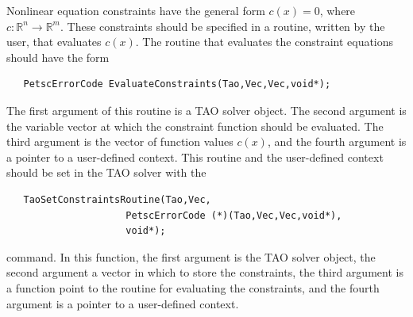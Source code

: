 \documentclass[]{book}
\newcommand{\R}{\mathbb R}
\renewcommand{\Re}{\R}
\begin{document}
Nonlinear equation constraints have the general form $c(x) = 0$, where 
$c: \Re^n \to \Re^m$.  These constraints should be specified in a routine, 
written by the user, that evaluates $c(x)$.  The routine that evaluates
the 
constraint equations should have the form
\begin{verbatim}
   PetscErrorCode EvaluateConstraints(Tao,Vec,Vec,void*);
\end{verbatim}
The first argument of this routine is a TAO solver object.  The
second argument is the variable vector at which the constraint function
should be evaluated.  
The third argument is the vector of function values $c(x)$, and the fourth
argument is a pointer to a user-defined context.  This routine and the 
user-defined context should be set in the TAO solver with the 
\begin{verbatim}
   TaoSetConstraintsRoutine(Tao,Vec,
                     PetscErrorCode (*)(Tao,Vec,Vec,void*),
                     void*);
\end{verbatim}
command. 
In this function, the first argument is the TAO solver object, the second 
argument a vector in which to store the constraints, the third argument is
a function point to the routine for evaluating the constraints, and the
fourth argument is a pointer to a user-defined context.
\end{document}
